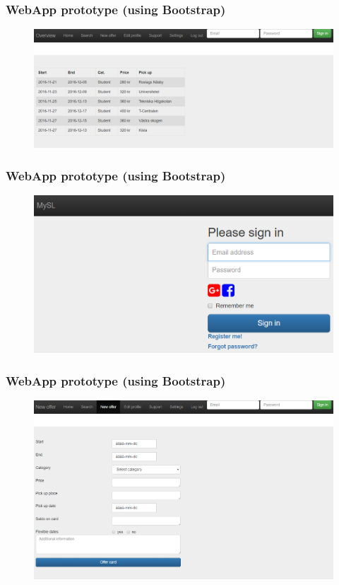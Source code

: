 \documentclass{beamer}
\begin{document}

\begin{frame}
\frametitle{WebApp prototype (using Bootstrap)}
\begin{figure}
\includegraphics[width=\textwidth]{png/webapp-overview.png}
\end{figure}
\end{frame}


\begin{frame}
\frametitle{WebApp prototype (using Bootstrap)}
\begin{figure}
\includegraphics[width=\textwidth]{png/webapp-login.png}
\end{figure}
\end{frame}


\begin{frame}
\frametitle{WebApp prototype (using Bootstrap)}
\begin{figure}
\includegraphics[width=\textwidth]{png/webapp-newoffer.png}
\end{figure}
\end{frame}
\end{document}

